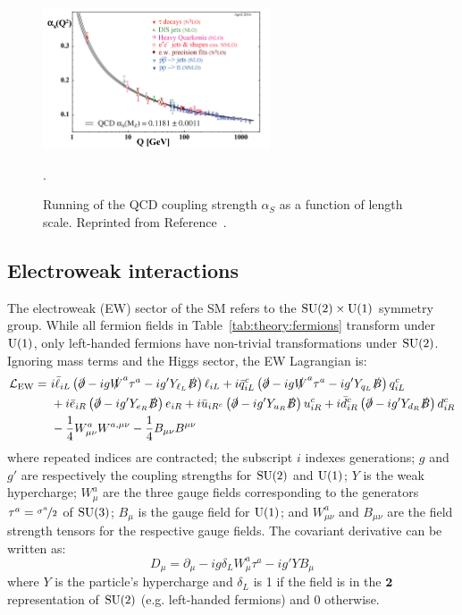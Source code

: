 \begin{figure}[]
\begin{center}
    \includegraphics[width=0.6\textwidth]{figures/theory/alphas.png}
    \caption{Running of the QCD coupling strength ${\alpha_S}$ as a function of length scale.
             Reprinted from Reference~\cite{pdg}.}
    \label{fig:theory:alphas}.
\end{center}
\end{figure}

\subsection{Electroweak interactions}
\label{sec:theory:ew}
The electroweak (EW) sector of the SM refers to the ${\operatorname{\mathrm{SU}}(2)\times\operatorname{\mathrm{U}}(1)}$ symmetry group.
While all fermion fields in Table~\ref{tab:theory:fermions} transform under ${\operatorname{\mathrm{U}}(1)}$, only left-handed fermions have non-trivial transformations under ${\operatorname{\mathrm{SU}}(2)}$.
Ignoring mass terms and the Higgs sector, the EW Lagrangian is:
\begin{align}
\mathcal{L}_\mathrm{EW} =~
        & i\bar\ell_{iL} \left(\slashed\partial-ig \slashed W^a \tau^a - ig'Y_{\ell_L} \slashed B\right)\ell_{iL} 
      + i\bar q_{iL}^{c} \left(\slashed\partial-ig \slashed W^a \tau^a - ig'Y_{q_L} \slashed B\right)q_{iL}^{c} \nonumber \\
      & + i\bar e_{iR} \left(\slashed\partial-ig'Y_{ e_R}\slashed B\right) e_{iR} 
       + i\bar u_{iR^{c}} \left(\slashed\partial-ig'Y_{u_R}\slashed B\right) u_{iR}^{c} 
       + i\bar d_{iR}^{c} \left(\slashed\partial-ig'Y_{d_R}\slashed B\right) d_{iR}^{c} \nonumber \\ 
      & - \frac{1}{4} W_{\mu\nu}^a W^{a,\mu\nu} - \frac{1}{4} B_{\mu\nu} B^{\mu\nu}  
      \label{eq:theory:lew}
\end{align}
where repeated indices are contracted; the subscript ${i}$ indexes generations; ${g}$ and ${g'}$ are respectively the coupling strengths for ${\operatorname{\mathrm{SU}}(2)}$ and ${\operatorname{\mathrm{U}}(1)}$; ${Y}$ is the weak hypercharge; ${W_\mu^a}$ are the three gauge fields corresponding to the generators ${\tau^a = \nicefrac{\sigma^a}{2}}$ of ${\operatorname{\mathrm{SU}}(3)}$; ${B_\mu}$ is the gauge field for ${\operatorname{\mathrm{U}}(1)}$; and ${W_{\mu\nu}^a}$ and ${B_{\mu\nu}}$ are the field strength tensors for the respective gauge fields.
The covariant derivative can be written as:
\begin{equation}
    D_\mu = \partial_\mu - ig\delta_L W^a_\mu \tau^a - ig' YB_\mu
\end{equation}
where ${Y}$ is the particle's hypercharge and ${\delta_L}$ is 1 if the field is in the ${\mathbf{2}}$ representation of ${\operatorname{\mathrm{SU}}(2)}$ (e.g. left-handed fermions) and 0 otherwise. 

